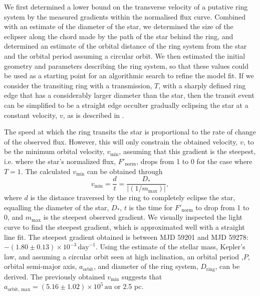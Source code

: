 \documentclass[letter]{aa} %
\begin{document}
We first determined a lower bound on the transverse velocity of a putative ring system by the measured gradients within the normalised flux curve.
%
Combined with an estimate of the diameter of the star, we determined the size of the eclipser along the chord made by the path of the star behind the ring, and determined an estimate of the orbital distance of the ring system from the star and the orbital period assuming a circular orbit.
%
We then estimated the initial geometry and parameters describing the ring system, so that these values could be used as a starting point for an algorithmic search to refine the model fit.
%
If we consider the transiting ring with a transmission, $T$, with a sharply defined ring edge that has a considerably larger diameter than the star, then the transit event can be simplified to be a straight edge occulter gradually eclipsing the star at a constant velocity, $v$, as is described in \cite{Kenworthy_2015}.

The speed at which the ring transits the star is proportional to the rate of change of the observed flux.
%
However, this will only constrain the obtained velocity, $v$, to be the minimum orbital velocity, $v_{\ensuremath{\mathrm{min}}}$, assuming that this gradient is the steepest, i.e. where the star's normalized flux,  $F'_{\mathrm{norm}}$, drops from 1 to 0 for the case where $T=1$.
%
The calculated $v_{\ensuremath{\mathrm{min}}}$ can be obtained through
\begin{equation}
\label{eq:min_v}
    v_{\mathrm{min}} = \frac{d}{t} = \frac{D_*}{|(1/m_{\mathrm{max}})|}
,\end{equation}
where $d$ is the distance traversed by the ring to completely eclipse the star, equalling the diameter of the star, $D_*$, $t$ is the time for $F'_{\ensuremath{\mathrm{ norm}}}$ to drop from 1 to 0, and $m_{\ensuremath{\mathrm{max}}}$ is the steepest observed gradient. 
%
We visually inspected the light curve to find the steepest gradient, which is approximated well with a straight line fit. %
%
The steepest gradient obtained is between MJD 59201 and MJD 59278: $-(1.80\pm0.13)\times10^{-3}\,\text{day}^{-1}$.
%
Using the estimate of the stellar mass, Kepler's law, and assuming a circular orbit seen at high inclination, an orbital period ,$P$, orbital semi-major axis, $a_{\mathrm{orbit}}$, and diameter of the ring system, $D_{\mathrm{ring}}$, can be derived.
%
The previously obtained $v_{\ensuremath{\mathrm{min}}}$ suggests that $a_{\mathrm{orbit, \,max}} = (5.16\pm1.02)\times10^5\,\ensuremath{\mathrm{au}}$ or 2.5 pc. 
\end{document}
